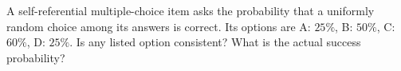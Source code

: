 A self-referential multiple-choice item asks the probability that a uniformly random choice among its answers is correct. Its options are A: $25\%$, B: $50\%$, C: $60\%$, D: $25\%$. Is any listed option consistent? What is the actual success probability?
